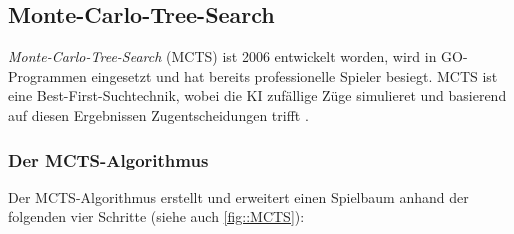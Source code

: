 \documentclass[12pt,a4paper,bibliography=totocnumbered,listof=totocnumbered]{article}
\begin{document}
\subsection{Monte-Carlo-Tree-Search}
\emph{Monte-Carlo-Tree-Search} (MCTS) ist 2006 entwickelt worden, wird in GO-Programmen eingesetzt und hat bereits professionelle Spieler besiegt. MCTS ist eine Best-First-Suchtechnik, wobei die KI zufällige Züge simulieret und basierend auf diesen Ergebnissen Zugentscheidungen trifft \citep{GuillaumeChaslot.2008}.

\subsubsection{Der MCTS-Algorithmus} \label{sec:mcts_alg}
Der MCTS-Algorithmus erstellt und erweitert einen Spielbaum anhand der folgenden vier Schritte (siehe auch \autoref{fig::MCTS}):
\end{document}
